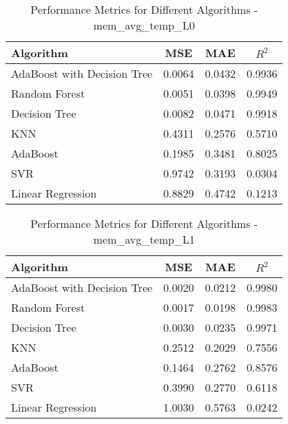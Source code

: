 \documentclass[conference]{IEEEtran}
\begin{document}
\begin{table}[ht]
	\centering
	\caption{Performance Metrics for Different Algorithms - mem\_avg\_temp\_L0}
	\label{tab:mem_avg_temp_L0}
	\begin{tabular}{lccc}
		\toprule
		\textbf{Algorithm} & \textbf{MSE} & \textbf{MAE} & \textbf{\(R^2\)} \\
		\midrule
		AdaBoost with Decision Tree & 0.0064 & 0.0432 & 0.9936 \\
		Random Forest & 0.0051 & 0.0398 & 0.9949 \\
		Decision Tree & 0.0082 & 0.0471 & 0.9918 \\
		KNN & 0.4311 & 0.2576 & 0.5710 \\
		AdaBoost & 0.1985 & 0.3481 & 0.8025 \\
		SVR & 0.9742 & 0.3193 & 0.0304 \\
		Linear Regression & 0.8829 & 0.4742 & 0.1213 \\
		\bottomrule
	\end{tabular}
\end{table}


\begin{table}[ht]
	\centering
	\caption{Performance Metrics for Different Algorithms - mem\_avg\_temp\_L1}
	\label{tab:mem_avg_temp_L1}
	\begin{tabular}{lccc}
		\toprule
		\textbf{Algorithm} & \textbf{MSE} & \textbf{MAE} & \textbf{\(R^2\)} \\
		\midrule
		AdaBoost with Decision Tree & 0.0020 & 0.0212 & 0.9980 \\
		Random Forest & 0.0017 & 0.0198 & 0.9983 \\
		Decision Tree & 0.0030 & 0.0235 & 0.9971 \\
		KNN & 0.2512 & 0.2029 & 0.7556 \\
		AdaBoost & 0.1464 & 0.2762 & 0.8576 \\
		SVR & 0.3990 & 0.2770 & 0.6118 \\
		Linear Regression & 1.0030 & 0.5763 & 0.0242 \\
		\bottomrule
	\end{tabular}
\end{table}
\end{document}

